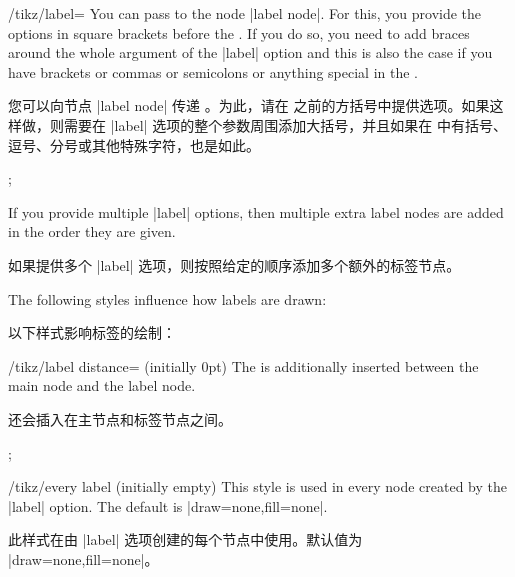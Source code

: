 \begin{key}{/tikz/label=}
    You can pass  to the node |label node|. For this, you provide
    the options in square brackets before the . If you do so, you
    need to add braces around the whole argument of the |label| option and this
    is also the case if you have brackets or commas or semicolons or anything
    special in the .
    
    您可以向节点 |label node| 传递 。为此，请在  之前的方括号中提供选项。如果这样做，则需要在 |label| 选项的整个参数周围添加大括号，并且如果在  中有括号、逗号、分号或其他特殊字符，也是如此。
\begin{codeexample}[]
\tikz {};
\end{codeexample}

\begin{codeexample}[]
\end{codeexample}

    If you provide multiple |label| options, then multiple extra label nodes
    are added in the order they are given.

    如果提供多个 |label| 选项，则按照给定的顺序添加多个额外的标签节点。    

    The following styles influence how labels are drawn:
    
    以下样式影响标签的绘制：

    \begin{key}{/tikz/label distance= (initially 0pt)}
        The  is additionally inserted between the main node and
        the label node.
        
         还会插入在主节点和标签节点之间。
\begin{codeexample}[]
\tikz[label distance=5mm]
  ;
\end{codeexample}
    \end{key}
    \begin{stylekey}{/tikz/every label (initially \normalfont empty)}
        This style is used in every node created by the |label| option. The
        default is |draw=none,fill=none|.

        此样式在由 |label| 选项创建的每个节点中使用。默认值为 |draw=none,fill=none|。
    \end{stylekey}
\end{key}

